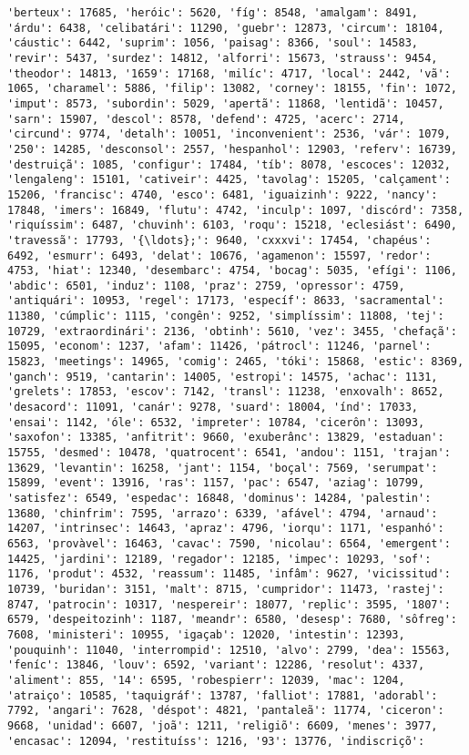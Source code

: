 \begin{Verbatim}[commandchars=\\\{\}]
'berteux': 17685, 'heróic': 5620, 'fíg': 8548, 'amalgam': 8491, 'árdu': 6438, 'celibatári': 11290, 'guebr': 12873, 'circum': 18104, 'cáustic': 6442, 'suprim': 1056, 'paisag': 8366, 'soul': 14583, 'revir': 5437, 'surdez': 14812, 'alforri': 15673, 'strauss': 9454, 'theodor': 14813, '1659': 17168, 'milíc': 4717, 'local': 2442, 'vã': 1065, 'charamel': 5886, 'filip': 13082, 'corney': 18155, 'fin': 1072, 'imput': 8573, 'subordin': 5029, 'apertã': 11868, 'lentidã': 10457, 'sarn': 15907, 'descol': 8578, 'defend': 4725, 'acerc': 2714, 'circund': 9774, 'detalh': 10051, 'inconvenient': 2536, 'vár': 1079, '250': 14285, 'desconsol': 2557, 'hespanhol': 12903, 'referv': 16739, 'destruiçã': 1085, 'configur': 17484, 'tíb': 8078, 'escoces': 12032, 'lengaleng': 15101, 'cativeir': 4425, 'tavolag': 15205, 'calçament': 15206, 'francisc': 4740, 'esco': 6481, 'iguaizinh': 9222, 'nancy': 17848, 'imers': 16849, 'flutu': 4742, 'inculp': 1097, 'discórd': 7358, 'riquíssim': 6487, 'chuvinh': 6103, 'roqu': 15218, 'eclesiást': 6490, 'travessã': 17793, '{\ldots};': 9640, 'cxxxvi': 17454, 'chapéus': 6492, 'esmurr': 6493, 'delat': 10676, 'agamenon': 15597, 'redor': 4753, 'hiat': 12340, 'desembarc': 4754, 'bocag': 5035, 'efígi': 1106, 'abdic': 6501, 'induz': 1108, 'praz': 2759, 'opressor': 4759, 'antiquári': 10953, 'regel': 17173, 'específ': 8633, 'sacramental': 11380, 'cúmplic': 1115, 'congên': 9252, 'simplíssim': 11808, 'tej': 10729, 'extraordinári': 2136, 'obtinh': 5610, 'vez': 3455, 'chefaçã': 15095, 'econom': 1237, 'afam': 11426, 'pátrocl': 11246, 'parnel': 15823, 'meetings': 14965, 'comig': 2465, 'tóki': 15868, 'estic': 8369, 'ganch': 9519, 'cantarin': 14005, 'estropi': 14575, 'achac': 1131, 'grelets': 17853, 'escov': 7142, 'transl': 11238, 'enxovalh': 8652, 'desacord': 11091, 'canár': 9278, 'suard': 18004, 'índ': 17033, 'ensai': 1142, 'óle': 6532, 'impreter': 10784, 'cicerôn': 13093, 'saxofon': 13385, 'anfitrit': 9660, 'exuberânc': 13829, 'estaduan': 15755, 'desmed': 10478, 'quatrocent': 6541, 'andou': 1151, 'trajan': 13629, 'levantin': 16258, 'jant': 1154, 'boçal': 7569, 'serumpat': 15899, 'event': 13916, 'ras': 1157, 'pac': 6547, 'aziag': 10799, 'satisfez': 6549, 'espedac': 16848, 'dominus': 14284, 'palestin': 13680, 'chinfrim': 7595, 'arrazo': 6339, 'afável': 4794, 'arnaud': 14207, 'intrinsec': 14643, 'apraz': 4796, 'iorqu': 1171, 'espanhó': 6563, 'provàvel': 16463, 'cavac': 7590, 'nicolau': 6564, 'emergent': 14425, 'jardini': 12189, 'regador': 12185, 'impec': 10293, 'sof': 1176, 'produt': 4532, 'reassum': 11485, 'infâm': 9627, 'vicissitud': 10739, 'buridan': 3151, 'malt': 8715, 'cumpridor': 11473, 'rastej': 8747, 'patrocin': 10317, 'nespereir': 18077, 'replic': 3595, '1807': 6579, 'despeitozinh': 1187, 'meandr': 6580, 'desesp': 7680, 'sôfreg': 7608, 'ministeri': 10955, 'igaçab': 12020, 'intestin': 12393, 'pouquinh': 11040, 'interrompid': 12510, 'alvo': 2799, 'dea': 15563, 'feníc': 13846, 'louv': 6592, 'variant': 12286, 'resolut': 4337, 'aliment': 855, '14': 6595, 'robespierr': 12039, 'mac': 1204, 'atraiço': 10585, 'taquigráf': 13787, 'falliot': 17881, 'adorabl': 7792, 'angari': 7628, 'déspot': 4821, 'pantaleã': 11774, 'ciceron': 9668, 'unidad': 6607, 'joã': 1211, 'religiõ': 6609, 'menes': 3977, 'encasac': 12094, 'restituíss': 1216, '93': 13776, 'indiscriçõ': 
\end{Verbatim}
